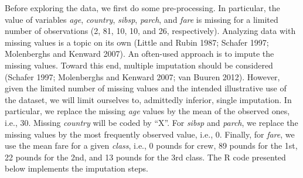 \documentclass[12pt,]{krantz}
\theoremstyle{definition}
\theoremstyle{definition}
\theoremstyle{definition}
\theoremstyle{remark}
\begin{document}
Before exploring the data, we first do some pre-processing. In
particular, the value of variables \emph{age}, \emph{country},
\emph{sibsp}, \emph{parch}, and \emph{fare} is missing for a limited
number of observations (2, 81, 10, 10, and 26, respectively). Analyzing
data with missing values is a topic on its own (Little and Rubin 1987;
Schafer 1997; Molenberghs and Kenward 2007). An often-used approach is
to impute the missing values. Toward this end, multiple imputation
should be considered (Schafer 1997; Molenberghs and Kenward 2007; van
Buuren 2012). However, given the limited number of missing values and
the intended illustrative use of the dataset, we will limit ourselves
to, admittedly inferior, single imputation. In particular, we replace
the missing \emph{age} values by the mean of the observed ones, i.e.,
30. Missing \emph{country} will be coded by ``X''. For \emph{sibsp} and
\emph{parch}, we replace the missing values by the most frequently
observed value, i.e., 0. Finally, for \emph{fare}, we use the mean fare
for a given \emph{class}, i.e., 0 pounds for crew, 89 pounds for the
1st, 22 pounds for the 2nd, and 13 pounds for the 3rd class. The R code
presented below implements the imputation steps.
\end{document}

